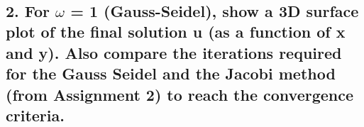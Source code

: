 \documentclass[11pt]{article}
\begin{document}
    \begin{center}
    \end{center}
    { \hspace*{\fill} \\}
    
    \begin{center}
    \end{center}
    { \hspace*{\fill} \\}
    
    \begin{center}
    \end{center}
    { \hspace*{\fill} \\}
    
    \begin{center}
    \end{center}
    { \hspace*{\fill} \\}
    
    \begin{center}
    \end{center}
    { \hspace*{\fill} \\}
    
    \begin{center}
    \end{center}
    { \hspace*{\fill} \\}
    
    \hypertarget{for-omega-1-gauss-seidel-show-a-3d-surface-plot-of-the-final-solution-u-as-a-function-of-x-and-y.-also-compare-the-iterations-required-for-the-gauss-seidel-and-the-jacobi-method-from-assignment-2-to-reach-the-convergence-criteria.}{%
\subsection{\texorpdfstring{2. For \(\omega\) = 1 (Gauss-Seidel), show a
3D surface plot of the final solution u (as a function of x and y). Also
compare the iterations required for the Gauss Seidel and the Jacobi
method (from Assignment 2) to reach the convergence
criteria.}{2. For \textbackslash{}omega = 1 (Gauss-Seidel), show a 3D surface plot of the final solution u (as a function of x and y). Also compare the iterations required for the Gauss Seidel and the Jacobi method (from Assignment 2) to reach the convergence criteria.}}\label{for-omega-1-gauss-seidel-show-a-3d-surface-plot-of-the-final-solution-u-as-a-function-of-x-and-y.-also-compare-the-iterations-required-for-the-gauss-seidel-and-the-jacobi-method-from-assignment-2-to-reach-the-convergence-criteria.}}
\end{document}
